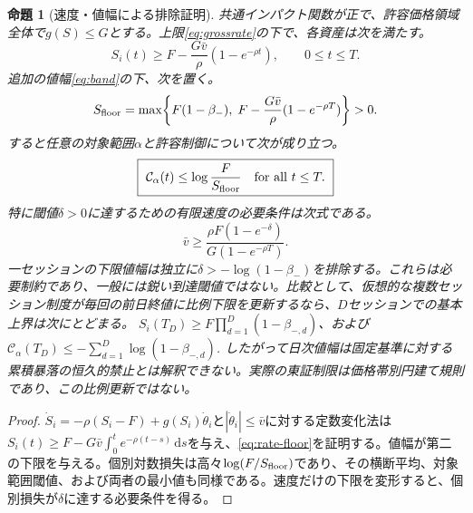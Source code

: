 \documentclass[11pt]{article}
\numberwithin{equation}{section}
\newtheorem{proposition}[theorem]{命題}
\theoremstyle{definition}
\theoremstyle{remark}
\newcommand{\dd}{\,\mathrm{d}}
\begin{document}
\begin{proposition}[速度・値幅による排除証明]\label{prop:rate-band}
共通インパクト関数が正で、許容価格領域全体で$g(S)\le G$とする。上限\eqref{eq:grossrate}の下で、各資産は次を満たす。
\begin{equation}\label{eq:rate-floor}
 S_i(t)\ge F-\frac{G\bar v}{\rho}(1-e^{-\rho t}),\qquad 0\le t\le T.
\end{equation}
追加の値幅\eqref{eq:band}の下、次を置く。
\begin{equation}\label{eq:twofloors}
 S_{\rm floor}=\max\!\left\{F(1-\beta_-),\;F-\frac{G\bar v}{\rho}(1-e^{-\rho T})\right\}>0.
\end{equation}
すると任意の対象範囲$\alpha$と許容制御について次が成り立つ。
\begin{equation}\label{eq:constrained-crisis}
\boxed{\ \mathcal C_\alpha(t)\le \log\frac{F}{S_{\rm floor}}\quad\hbox{for all }t\le T.\ }
\end{equation}
特に閾値$\delta>0$に達するための有限速度の必要条件は次式である。
\begin{equation}\label{eq:min-speed}
\boxed{\ \bar v\ge\frac{\rho F(1-e^{-\delta})}{G(1-e^{-\rho T})}.\ }
\end{equation}
一セッションの下限値幅は独立に$\delta> -\log(1-\beta_-)$を排除する。これらは\emph{必要}制約であり、一般には鋭い到達閾値ではない。比較として、\emph{仮想的な}複数セッション制度が毎回の前日終値に比例下限を更新するなら、$D$セッションでの基本上界は次にとどまる。
$S_i(T_D)\ge F\prod_{d=1}^D(1-\beta_{-,d})$、および
$\mathcal C_\alpha(T_D)\le-\sum_{d=1}^D\log(1-\beta_{-,d})$.
したがって日次値幅は固定基準に対する累積暴落の恒久的禁止とは解釈できない。実際の東証制限は価格帯別円建て規則であり、この比例更新ではない。
\end{proposition}
\begin{proof}
$\dot S_i=-\rho(S_i-F)+g(S_i)\dot\theta_i$と$|\dot\theta_i|\le\bar v$に対する定数変化法は$S_i(t)\ge F-G\bar v\int_0^t e^{-\rho(t-s)}\dd s$を与え、\eqref{eq:rate-floor}を証明する。値幅が第二の下限を与える。個別対数損失は高々$\log(F/S_{\rm floor})$であり、その横断平均、対象範囲閾値、および両者の最小値も同様である。速度だけの下限を変形すると、個別損失が$\delta$に達する必要条件を得る。
\end{proof}
\end{document}
